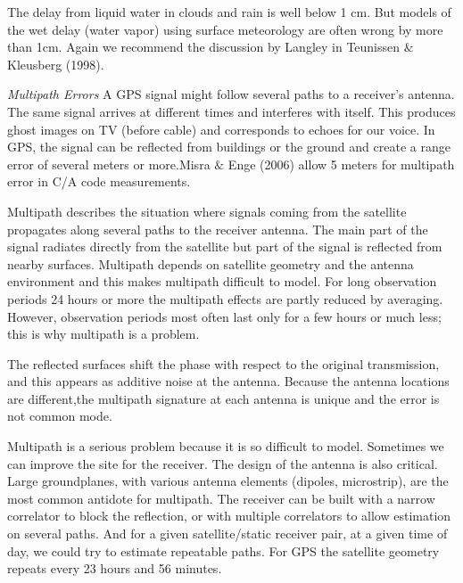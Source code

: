 		The delay from liquid water in clouds and rain is well below 1 cm. But models of the wet delay (water vapor) using surface meteorology are often wrong by more than 1cm. Again we recommend the discussion by Langley in Teunissen $\&$ Kleusberg (1998).
		
		\textit{Multipath Errors} A GPS signal might follow several paths to a receiver’s antenna. The same signal arrives at different times and interferes with itself. This produces ghost images on TV (before cable) and corresponds to echoes for our voice. In GPS, the signal can be reflected from buildings or the ground and create a range error of several meters or more.Misra $\&$ Enge (2006) allow 5 meters for multipath error in C/A code measurements.
		
		Multipath describes the situation where signals coming from the satellite propagates along several paths to the receiver antenna. The main part of the signal radiates directly from the satellite but part of the signal is reflected from nearby surfaces. Multipath depends on satellite geometry and the antenna environment and this makes multipath difficult to model. For long observation periods 24 hours or more the multipath effects are partly reduced by averaging. However, observation periods most often last only for a few hours or much less; this is why multipath is a problem.
		
		The reflected surfaces shift the phase with respect to the original transmission, and this appears as additive noise at the antenna. Because the antenna locations are different,the multipath signature at each antenna is unique and the error is not common mode.
		
		Multipath is a serious problem because it is so difficult to model. Sometimes we can improve the site for the receiver. The design of the antenna is also critical. Large groundplanes, with various antenna elements (dipoles, microstrip), are the most common antidote for multipath. The receiver can be built with a narrow correlator to block the reflection, or with multiple correlators to allow estimation on several paths. And for a given satellite/static receiver pair, at a given time of day, we could try to estimate repeatable paths. For GPS the satellite geometry repeats every 23 hours and 56 minutes.
		

